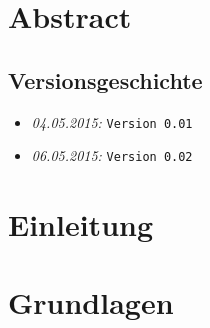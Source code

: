 \documentclass{fhnwreport/fhnwreport}
\begin{document}



\section*{Abstract}
\label{sec:abstract}



\clearpage




\tableofcontents

\vspace{80mm}
\subsection*{Versionsgeschichte}
\begin{itemize}
    \item[]
        \emph{04.05.2015:} \texttt{Version 0.01}
    \item[]
        \emph{06.05.2015:} \texttt{Version 0.02}
\end{itemize}
\clearpage



\clearpage
\section{Einleitung}
\label{sec:einleitung}



\clearpage
\section{Grundlagen}
\label{sec:grundlagen}

\end{document}
